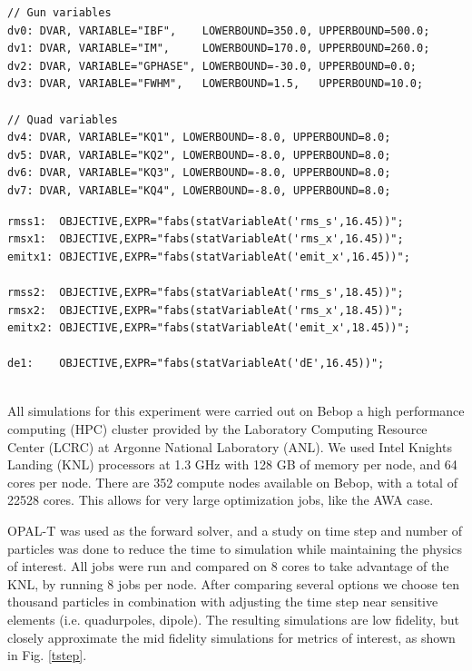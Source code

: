 \vspace{0.2cm}
{\footnotesize \begin{verbatim}
// Gun variables
dv0: DVAR, VARIABLE="IBF",    LOWERBOUND=350.0, UPPERBOUND=500.0;
dv1: DVAR, VARIABLE="IM",     LOWERBOUND=170.0, UPPERBOUND=260.0;
dv2: DVAR, VARIABLE="GPHASE", LOWERBOUND=-30.0, UPPERBOUND=0.0;
dv3: DVAR, VARIABLE="FWHM",   LOWERBOUND=1.5,   UPPERBOUND=10.0;

// Quad variables
dv4: DVAR, VARIABLE="KQ1", LOWERBOUND=-8.0, UPPERBOUND=8.0;
dv5: DVAR, VARIABLE="KQ2", LOWERBOUND=-8.0, UPPERBOUND=8.0;
dv6: DVAR, VARIABLE="KQ3", LOWERBOUND=-8.0, UPPERBOUND=8.0;
dv7: DVAR, VARIABLE="KQ4", LOWERBOUND=-8.0, UPPERBOUND=8.0;

	\end{verbatim}}
\vspace{0.2cm}
 
 \vspace{0.2cm}
 {\footnotesize \begin{verbatim}
rmss1:  OBJECTIVE,EXPR="fabs(statVariableAt('rms_s',16.45))";
rmsx1:  OBJECTIVE,EXPR="fabs(statVariableAt('rms_x',16.45))";
emitx1: OBJECTIVE,EXPR="fabs(statVariableAt('emit_x',16.45))";
 
rmss2:  OBJECTIVE,EXPR="fabs(statVariableAt('rms_s',18.45))";
rmsx2:  OBJECTIVE,EXPR="fabs(statVariableAt('rms_x',18.45))";
emitx2: OBJECTIVE,EXPR="fabs(statVariableAt('emit_x',18.45))";
 
de1:    OBJECTIVE,EXPR="fabs(statVariableAt('dE',16.45))";
 
	\end{verbatim}}
\vspace{0.2cm}

All simulations for this experiment were carried out on Bebop a
high performance computing (HPC)
cluster provided by the Laboratory Computing Resource Center (LCRC)
at Argonne National Laboratory (ANL). We used Intel Knights Landing 
(KNL) processors at 1.3 GHz with 128 GB of memory per node, 
and 64 cores per node. There are 352 compute nodes available on 
Bebop, with a total of 22528 cores. 
This allows for very large optimization jobs, like the AWA case.

OPAL-T was used as the forward solver, and a study on time step and 
number of particles was done to reduce the time to simulation while 
maintaining the physics of interest. All jobs were run and compared 
on 8 cores to take advantage of the KNL, by running 8 jobs per node.
After comparing several options we choose ten thousand particles 
in combination with adjusting the time step near sensitive elements 
(i.e. quadurpoles, dipole). 
The resulting simulations are low fidelity, but closely approximate 
the mid fidelity simulations for metrics of interest, as shown in 
Fig. \ref{tstep}.

